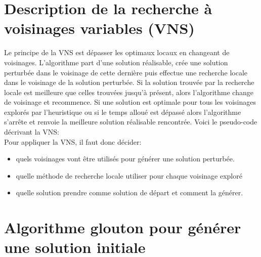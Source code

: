\documentclass[fleqn]{article}
\begin{document}
\section{Description de la recherche à voisinages variables (VNS)}
Le principe de la VNS est dépasser les optimaux locaux en changeant de voisinages. L'algorithme part d'une solution réalisable, crée une solution perturbée dans le voisinage de cette dernière puis effectue une recherche locale dans le voisinage de la solution perturbée. Si la solution trouvée par la recherche locale est meilleure que celles trouvées jusqu'à présent, alors l'algorithme change de voisinage et recommence. Si une solution est optimale pour tous les voisinages explorés par l'heuristique ou si le temps alloué est dépassé alors l'algorithme s'arrête et renvoie la meilleure solution réalisable rencontrée.
Voici le pseudo-code décrivant la VNS:\\
Pour appliquer la VNS, il faut donc décider:
\begin{itemize} 
\item quels voisinages vont être utilisés pour générer une solution perturbée.
\item quelle méthode de recherche locale utiliser pour chaque voisinage exploré
\item quelle solution prendre comme solution de départ et comment la générer.
\end{itemize}
\section{Algorithme glouton pour générer une solution initiale}
\end{document}
